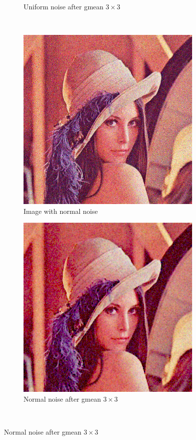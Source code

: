 \documentclass[12pt]{article}
\begin{document}
\begin{figure}[ht]
\begin{subfigure}[t]{.4\textwidth}
        \caption{Uniform noise after gmean $3\times3$}
    \end{subfigure}\\[2em]
    \begin{subfigure}[t]{.4\textwidth}\centering
        \includegraphics[width=.8\textwidth]{lenac_normal3}
        \caption{Image with normal noise}
    \end{subfigure}
    \begin{subfigure}[t]{.4\textwidth}\centering
        \includegraphics[width=.8\textwidth]{lenac_normal_gmean}
        \caption{Normal noise after gmean $3\times3$}
    \end{subfigure}\\[2em]

\end{figure}
\end{document}
